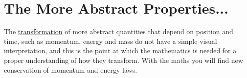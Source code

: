 



\section{The More Abstract Properties...}%

The \hyperlink{def-transform}{transformation} of more abstract quantities that depend on position and time, such as momentum, energy and mass do not have a simple visual interpretation, and this is the point at which the mathematics is needed for a proper understanding of how they transform. With the maths you will find new conservation of momentum and energy laws.





